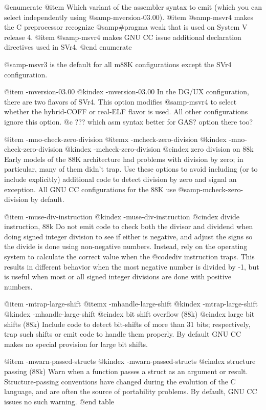 {{@enumerate
@item 
Which variant of the assembler syntax to emit (which you can select
independently using @samp{-mversion-03.00}).  
@item
@samp{-msvr4} makes the C preprocessor recognize @samp{#pragma weak}
that is used on System V release 4.
@item
@samp{-msvr4} makes GNU CC issue additional declaration directives used in
SVr4.  
@end enumerate

@samp{-msvr3} is the default for all m88K configurations except
the SVr4 configuration.

@item -mversion-03.00
@kindex -mversion-03.00
In the DG/UX configuration, there are two flavors of SVr4.  This option
modifies @samp{-msvr4} to select whether the hybrid-COFF or real-ELF
flavor is used.  All other configurations ignore this option.
@c ??? which asm syntax better for GAS?  option there too?

@item -mno-check-zero-division
@itemx -mcheck-zero-division
@kindex -mno-check-zero-division
@kindex -mcheck-zero-division
@cindex zero division on 88k
Early models of the 88K architecture had problems with division by zero;
in particular, many of them didn't trap.  Use these options to avoid
including (or to include explicitly) additional code to detect division
by zero and signal an exception.  All GNU CC configurations for the 88K use
@samp{-mcheck-zero-division} by default.

@item -muse-div-instruction
@kindex -muse-div-instruction
@cindex divide instruction, 88k
Do not emit code to check both the divisor and dividend when doing
signed integer division to see if either is negative, and adjust the
signs so the divide is done using non-negative numbers.  Instead, rely
on the operating system to calculate the correct value when the
@code{div} instruction traps.  This results in different behavior when
the most negative number is divided by -1, but is useful when most or
all signed integer divisions are done with positive numbers.

@item -mtrap-large-shift
@itemx -mhandle-large-shift
@kindex -mtrap-large-shift
@kindex -mhandle-large-shift
@cindex bit shift overflow (88k)
@cindex large bit shifts (88k)
Include code to detect bit-shifts of more than 31 bits; respectively,
trap such shifts or emit code to handle them properly.  By default GNU CC
makes no special provision for large bit shifts.

@item -mwarn-passed-structs
@kindex -mwarn-passed-structs
@cindex structure passing (88k)
Warn when a function passes a struct as an argument or result.
Structure-passing conventions have changed during the evolution of the C
language, and are often the source of portability problems.  By default,
GNU CC issues no such warning.
@end table

}}

